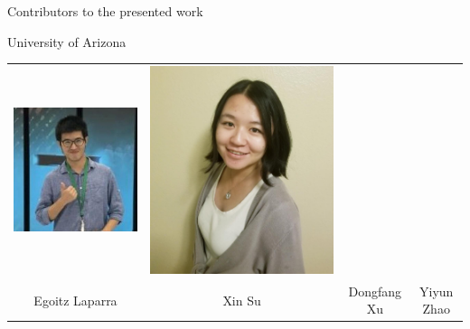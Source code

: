\documentclass[14pt]{beamer}
\begin{document}
\begin{frame}{Contributors to the presented work}
\begin{block}{University of Arizona}
\begin{tabular}{c c c c }
\includegraphics[height=0.2\textheight]{Dongfang.jpg} &
\includegraphics[height=0.2\textheight]{Yiyun.jpg} \\
Egoitz Laparra & Xin Su & Dongfang Xu & Yiyun Zhao
\end{tabular}
\end{block}


\end{frame}
\end{document}
